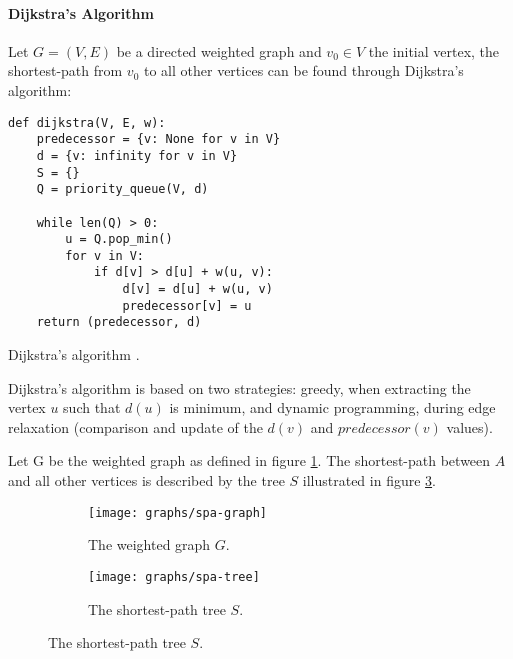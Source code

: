 \paragraph{Dijkstra's Algorithm}

Let $G=(V, E)$ be a directed weighted graph and $v_0 \in V$ the initial vertex, the shortest-path from $v_0$ to all other vertices can be found through Dijkstra's algorithm:
\begin{listing}[H]
\begin{verbatim}
def dijkstra(V, E, w):
    predecessor = {v: None for v in V}
    d = {v: infinity for v in V}
    S = {}
    Q = priority_queue(V, d)
	
    while len(Q) > 0:
        u = Q.pop_min()
        for v in V:
            if d[v] > d[u] + w(u, v):
                d[v] = d[u] + w(u, v)
                predecessor[v] = u
    return (predecessor, d)
\end{verbatim}
\caption{Dijkstra's algorithm \cite{cor2011}.}
\end{listing}


\begin{remark}
	Dijkstra's algorithm is based on two strategies: greedy, when extracting the vertex $u$ such that $d(u)$ is minimum, and dynamic programming, during edge relaxation (comparison and update of the $d(v)$ and $predecessor(v)$ values).
\end{remark}

\begin{example}
	Let G be the weighted graph as defined in figure \ref{fig:spa-graph}. The shortest-path between $A$ and all other vertices is described by the tree $S$ illustrated in figure \ref{fig:spa-tree}.

	\begin{figure}[H]
		\centering
		\begin{subfigure}{.4\linewidth}
			\texttt{[image: graphs/spa-graph]}
			\captionsetup{justification=centering}
			\caption{The weighted graph $G$.}
			\label{fig:spa-graph}
		\end{subfigure}
		\begin{subfigure}{.4\linewidth}
			\texttt{[image: graphs/spa-tree]}
			\captionsetup{justification=centering}
			\caption{The shortest-path tree $S$.}
			\label{fig:spa-tree}
		\end{subfigure}
	\end{figure}
\end{example}

